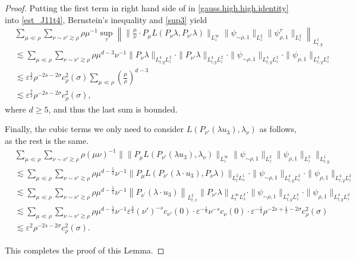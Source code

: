 \documentclass[10pt,a4paper]{amsart}
\begin{document}
\begin{proof}
Putting  the first term in right hand side of in
\eqref{gauss.high.high.identity} into \eqref{est_J11t4}, Bernstein's inequality and \eqref{sup3} yield
\begin{align*}
 &\sum_{\mu\ll\rho}
\sum_{\nu\sim\nu'\gtrsim\rho}
\rho\mu^{-1}
\sup_\tau
\left\|
\| \frac{\mu}{\nu} \cdot P_\mu L(P_\nu\lambda,P_{\nu'}\lambda)\|_{L_z^\infty}
\|\psi_{\sim\rho,1}\|_{L_z^2}
\|\psi_{\rho,1}^\tau\|_{L_z^2}
\right\|_{L_{t,y}^1}
\\
& \lesssim
\sum_{\mu\ll\rho}
\sum_{\nu\sim\nu'\gtrsim\rho}
\rho\mu^{d-3}\nu^{-1}
\|P_\nu\lambda\|_{L_{t,y}^4L_z^2} \cdot
\|P_{\nu'}\lambda\|_{L_{t,y}^4L_z^2}
 \cdot
\|\psi_{\sim\rho,1}\|_{L_{t,y}^4L_z^2}\cdot
\|\psi_{\rho,1}\|_{L_{t,y}^4L_z^2}
\\
& \lesssim
\varepsilon^{\frac32}
\rho^{-2s-2\sigma}
c_\rho^2(\sigma)
\sum_{\mu\ll\rho}
\left(\frac{\mu}{\rho}\right)^{d-3}\\
&\lesssim  \varepsilon^{\frac32}
\rho^{-2s-2\sigma}
c_\rho^2(\sigma),
\end{align*}
where \(d\geq5\),  and thus  the last sum is bounded.

Finally, the cubic terms we only need to consider \(L\left(
P_{\nu'}(\lambda  u_3),
\lambda_{\nu} \right)\) as follows, as the rest is the same.
\begin{align}
& \sum_{\mu\ll\rho}\sum_{ \nu\sim\nu'\gtrsim\rho }
\rho (\mu \nu)^{-1}
\Big\|
\|P_\mu
L\left(
P_{\nu'}(\lambda  u_3),
\lambda_{\nu}
\right)\|_{L_z^\infty}   
\|\psi_{\sim\rho,1}\|_{L_z^2}
\|\psi_{\rho,1} \|_{L_z^2}
\Big\|_{L_{t,y}^1} \label{cubic.high.high}\\
&\lesssim	 \sum_{\mu\ll\rho}\sum_{ \nu\sim\nu'\gtrsim\rho }
\rho\mu^{d-\frac 52}\nu^{-1}\| P_\mu
L\left(
P_{\nu'}(\lambda\cdot u_3),
P_{\nu}\lambda
\right)\|_{L^2_{t } L^1_x}  \cdot
\|\psi_{\sim\rho,1}\|_{L_{t,y}^4L_z^2}\cdot
\|\psi_{\rho,1}\|_{L_{t,y}^4L_z^2} \nonumber\\
&\lesssim  	 \sum_{\mu\ll\rho}\sum_{ \nu\sim\nu'\gtrsim\rho }
\rho\mu^{d-\frac 52}\nu^{-1}\left\|P_{\nu^\prime } ( \lambda \cdot u_3) \right\|_{L^2_{t,x}}  \left\| P_{\nu'} \lambda   \right\|_{L^\infty_{t } L^2_x} \cdot
\|\psi_{\sim\rho,1}\|_{L_{t,y}^4L_z^2}\cdot
\|\psi_{\rho,1}\|_{L_{t,y}^4L_z^2}  \nonumber\\
&\lesssim   \sum_{\mu\ll\rho}\sum_{ \nu\sim\nu'\gtrsim\rho }
\rho\mu^{d-\frac 52}\nu^{-1} \varepsilon^{\frac34}(\nu')^{-s} c_{\nu'}(0)\cdot \varepsilon^{-\frac 18}\nu^{-s}c_{\nu}(0) \cdot  \varepsilon^{-\frac 14} \rho^{-2s+\frac12-2\sigma} c^{2}_{\rho} (\sigma) \nonumber\\
& \lesssim \varepsilon^{2}
\rho^{-2s-2\sigma}
c_\rho^2(\sigma). \nonumber
\end{align}

 

This completes the proof of this Lemma.

  
 \end{proof}
\end{document}
